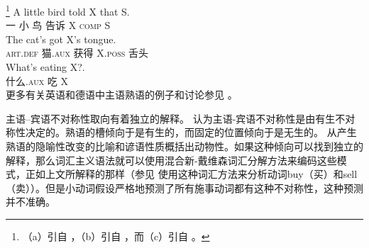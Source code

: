 \footnote{%
（a）引自 ，（b）引自 ，而（c）引自 。
}
\eal
\ex\label{bird}
\gll A little bird told X that S.\\
     一 小 鸟 告诉 X \textsc{comp} S\\
\ex\label{cat-tounge}
\gll The cat's got X's tongue.\\
     \textsc{art}.\textsc{def} 猫.\textsc{aux} 获得 X.\textsc{poss} 舌头\\
\ex\label{what-is-eating-x}
\gll What's eating X?.\\
     什么.\textsc{aux} 吃 X\\
\zl
更多有关英语和德语中主语熟语的例子和讨论参见 。

主语--宾语不对称性取向有着独立的解释。 \citet*{NSW94a}认为主语-宾语不对称性是由有生不对称性决定的。熟语的槽倾向于是有生的，而固定的位置倾向于是无生的。 \citet{NSW94a}从产生熟语的隐喻性改变的比喻和谚语性质概括出动物性。如果这种倾向可以找到独立的解释，那么词汇主义语法就可以使用混合新-戴维森词汇分解方法来编码这些模式，正如上文所解释的那样（参见 \citet{Wechsler2005a}使用这种词汇方法来分析动词buy（买）和sell（卖））。但是小动词假设严格地预测了所有施事动词都有这种不对称性，这种预测并不准确。

